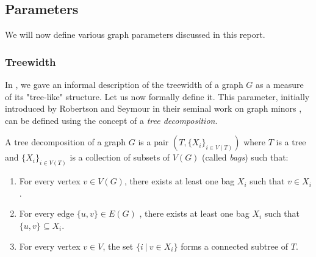 
\begin{problem}
\end{problem}

\subsection{Parameters}

We will now define various graph parameters discussed in this report.

\subsubsection*{Treewidth}

In , we gave an informal description of the treewidth of a graph $G$ as a measure of its "tree-like" structure. Let us now formally define it. This parameter, initially introduced by Robertson and Seymour in their seminal work on graph minors \cite{robertson1986graph}, can be defined using the concept of a \textit{tree decomposition}.

\begin{definition}
    A tree decomposition of a graph $G$ is a pair $(T, \{X_i\}_{i \in V(T)})$ where $T$ is a tree and $\{X_i\}_{i \in V(T)}$ is a collection of subsets of $V(G)$ (called \emph{bags}) such that:
    \begin{enumerate}
        \item For every vertex $v \in V(G)$, there exists at least one bag $X_i$ such that $v \in X_i$.
        \item For every edge $\{u, v\} \in E(G)$ , there exists at least one bag $X_i$ such that $\{u, v\} \subseteq X_i$.
        \item For every vertex $v \in V$, the set $\{i\ |\ v \in X_i\}$ forms a connected subtree of $T$.
    \end{enumerate}
\end{definition}

